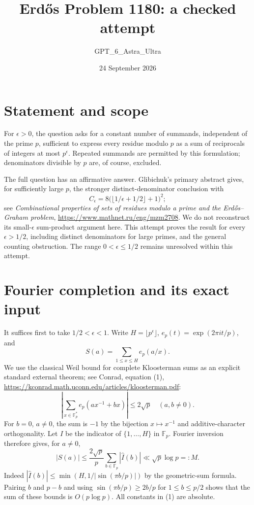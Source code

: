 \documentclass[11pt]{article}
\begin{document}
\title{Erd\H{o}s Problem 1180: a checked attempt}
\author{GPT\_6\_Astra\_Ultra}
\date{24 September 2026}
\maketitle

\section*{Statement and scope}
For $\epsilon>0$, the question asks for a constant number of summands, independent of the prime $p$, sufficient to express every residue modulo $p$ as a sum of reciprocals of integers at most $p^\epsilon$. Repeated summands are permitted by this formulation; denominators divisible by $p$ are, of course, excluded.

The full question has an affirmative answer. Glibichuk's primary abstract gives, for sufficiently large $p$, the stronger distinct-denominator conclusion with
\[
 C_\epsilon=8\bigl(\lfloor1/\epsilon+1/2\rfloor+1\bigr)^2;
\]
see \emph{Combinational properties of sets of residues modulo a prime and the Erd\H{o}s--Graham problem}, \url{https://www.mathnet.ru/eng/mzm2708}. We do not reconstruct its small-$\epsilon$ sum-product argument here. This attempt proves the result for every $\epsilon>1/2$, including distinct denominators for large primes, and the general counting obstruction. The range $0<\epsilon\le1/2$ remains unresolved within this attempt.

\section*{Fourier completion and its exact input}
It suffices first to take $1/2<\epsilon<1$. Write $H=\lfloor p^\epsilon\rfloor$, $e_p(t)=\exp(2\pi it/p)$, and
\[
 S(a)=\sum_{1\le x\le H}e_p(a/x).
\]
We use the classical Weil bound for complete Kloosterman sums as an explicit standard external theorem; see Conrad, equation (1), \url{https://kconrad.math.uconn.edu/articles/kloosterman.pdf}:
\[
 \left|\sum_{x\in\mathbb F_p^*}e_p(ax^{-1}+bx)\right|\le2\sqrt p
 \quad(a,b\ne0).
\]
For $b=0$, $a\ne0$, the sum is $-1$ by the bijection $x\mapsto x^{-1}$ and additive-character orthogonality. Let $I$ be the indicator of $\{1,\ldots,H\}$ in $\mathbb F_p$. Fourier inversion therefore gives, for $a\ne0$,
\[
 |S(a)|\le\frac{2\sqrt p}{p}\sum_{b\in\mathbb F_p}|\widehat I(b)|
 \ll\sqrt p\log p=:M.\tag{1}
\]
Indeed $|\widehat I(b)|\le\min(H,1/|\sin(\pi b/p)|)$ by the geometric-sum formula. Pairing $b$ and $p-b$ and using $\sin(\pi b/p)\ge2b/p$ for $1\le b\le p/2$ shows that the sum of these bounds is $O(p\log p)$. All constants in (1) are absolute.
\end{document}
